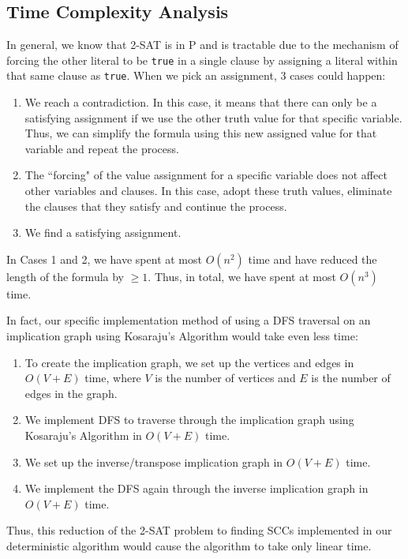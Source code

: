 \documentclass[11pt,fancychapters]{article}
\begin{document}
\subsection{Time Complexity Analysis}

In general, we know that 2-SAT is in P and is tractable due to the mechanism of forcing the other literal to be \texttt{true} in a single clause by assigning a literal within that same clause as \texttt{true}. When we pick an assignment, 3 cases could happen:

\begin{enumerate}
    \item We reach a contradiction. In this case, it means that there can only be a satisfying assignment if we use the other truth value for that specific variable. Thus, we can simplify the formula using this new assigned value for that variable and repeat the process.
    \item The ``forcing" of the value assignment for a specific variable does not affect other variables and clauses. In this case, adopt these truth values, eliminate the clauses that they satisfy and continue the process.
    \item We find a satisfying assignment.
\end{enumerate}

In Cases 1 and 2, we have spent at most $O(n^2)$ time and have reduced the length of the formula by $\geq 1$. Thus, in total, we have spent at most $O(n^3)$ time.\newline

In fact, our specific implementation method of using a DFS traversal on an implication graph using Kosaraju's Algorithm would take even less time:

\begin{enumerate}
    \item To create the implication graph, we set up the vertices and edges in $O(V + E)$ time, where $V$ is the number of vertices and $E$ is the number of edges in the graph.
    \item We implement DFS to traverse through the implication graph using Kosaraju's Algorithm in $O(V + E)$ time.
    \item We set up the inverse/transpose implication graph in $O(V + E)$ time.
    \item We implement the DFS again through the inverse implication graph in $O(V + E)$ time.
\end{enumerate}

Thus, this reduction of the 2-SAT problem to finding SCCs implemented in our deterministic algorithm would cause the algorithm to take only linear time.\newline
\end{document}
